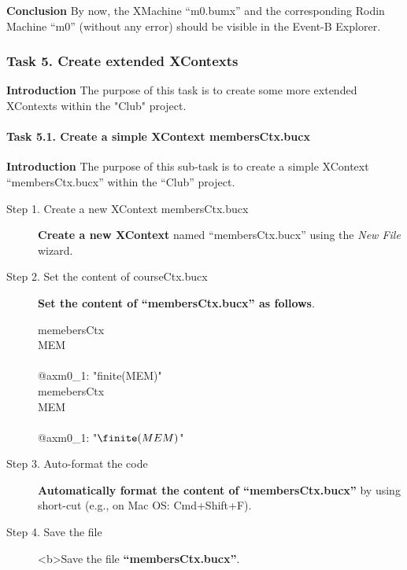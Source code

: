 \textbf{Conclusion} By now, the XMachine ``m0.bumx'' and the corresponding Rodin Machine ``m0'' (without any error) should be visible in the Event-B Explorer.

\subsubsection{Task 5. Create extended XContexts}
\textbf{Introduction} The purpose of this task is to create some more extended XContexts within the "Club" project.

\paragraph{Task 5.1. Create a simple XContext membersCtx.bucx}
\textbf{Introduction} The purpose of this sub-task is to create a simple XContext ``membersCtx.bucx'' within the ``Club'' project.
\begin{description}
\item[Step 1. Create a new XContext membersCtx.bucx] \textbf{Create a new XContext} named ``membersCtx.bucx'' using the \emph{New File} wizard.

\item[Step 2. Set the content of courseCtx.bucx] \textbf{Set the content of ``membersCtx.bucx'' as follows}.
  \begin{center}
    \begin{Bcode}
      \ifplastex
      \Bcontext{} memebersCtx\\
      \Bsets{} MEM\\
      \Baxioms\\
      @axm0_1: "finite(MEM)"\\
      \Bend
      \else
      \Bcontext{} memebersCtx\\
      \Bsets{} MEM\\
      \Baxioms\\
      \Btab @axm0_1: "\(\finite(MEM)\)"\\
      \Bend
      \fi
    \end{Bcode}
  \end{center}

\item [Step 3. Auto-format the code] \textbf{Automatically format the content of ``membersCtx.bucx''} by using short-cut (e.g., on Mac OS: Cmd+Shift+F).

\item[Step 4. Save the file] <b>Save the file \textbf{``membersCtx.bucx''}.
\end{description}

